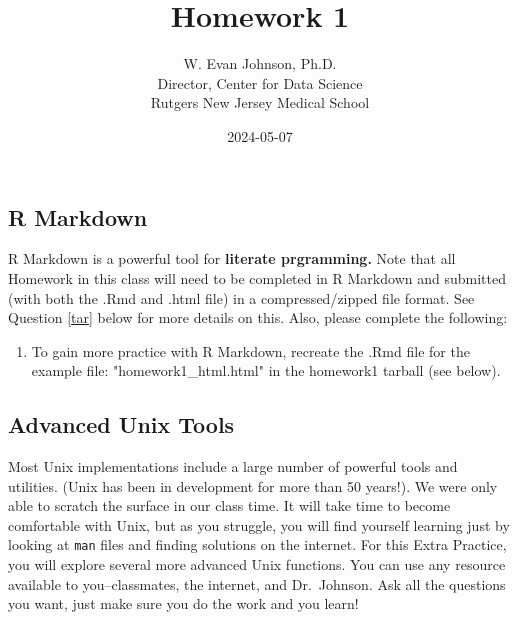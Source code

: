 \documentclass[
]{article}
\title{Homework 1}
\author{W. Evan Johnson, Ph.D.\\
Director, Center for Data Science\\
Rutgers New Jersey Medical School}
\date{2024-05-07}
\begin{document}
\maketitle

\subsection*{R Markdown}

R Markdown is a powerful tool for \textbf{literate prgramming.} Note
that all Homework in this class will need to be completed in R Markdown
and submitted (with both the .Rmd and .html file) in a compressed/zipped
file format. See Question \ref{tar} below for more details on this.
Also, please complete the following:

\begin{enumerate}
    \item To gain more practice with R Markdown, recreate the .Rmd file for the example file: "homework1\_html.html" in the homework1 tarball (see below). 
\end{enumerate}

\subsection*{Advanced Unix Tools}

Most Unix implementations include a large number of powerful tools and
utilities. (Unix has been in development for more than 50 years!). We
were only able to scratch the surface in our class time. It will take
time to become comfortable with Unix, but as you struggle, you will find
yourself learning just by looking at \texttt{man} files and finding
solutions on the internet. For this Extra Practice, you will explore
several more advanced Unix functions. You can use any resource available
to you--classmates, the internet, and Dr.~Johnson. Ask all the questions
you want, just make sure you do the work and you learn!
\end{document}

